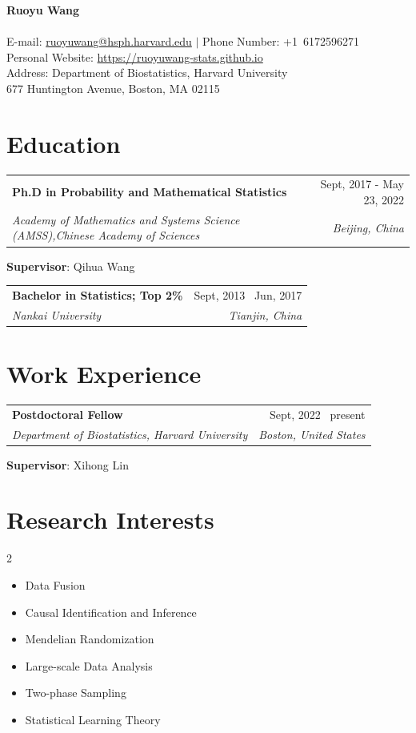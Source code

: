 \documentclass[letterpaper,12pt]{article}
\makeatletter
\newcommand{\resumeItemNoBullet}[2]{
  \item[]\small{
    \hspace{-9pt}\textbf{#1}{: #2 \vspace{-6pt}}
  }
}
\newcommand{\resumeSubheading}[4]{
  \vspace{-1pt}\item[]
  \begin{tabular*}{0.98\textwidth}{l@{\extracolsep{\fill}}r}
      \hspace{-10pt}\textbf{#1} & #2 \\
      \hspace{-10pt}\textit{\small#3} & \textit{\small #4} \\
    \end{tabular*}\vspace{-5pt}
}
\newcommand{\resumeSubHeadingListStart}{\begin{itemize}[leftmargin=*]}
\newcommand{\resumeSubHeadingListEnd}{\end{itemize}}
\newcommand{\shorterSection}[1]{\vspace{-10pt}\section{#1}}
\makeatother
\begin{document}
\begin{center}
  \small \textbf{%
  {\huge Ruoyu Wang}} \\
~\\
 \normalsize{
	E-mail: \href{mailto:ruoyuwang@hsph.harvard.edu}
	{\color{blue}ruoyuwang@hsph.harvard.edu} $\vert$ Phone Number:
	+1\ 6172596271}\\
   Personal Website: \href{https://ruoyuwang-stats.github.io}
   {\color{blue}https://ruoyuwang-stats.github.io}\\
  \normalsize{Address: Department of Biostatistics, Harvard University\\677 Huntington Avenue, Boston, MA 02115}
\end{center}

\shorterSection{Education}
  \resumeSubHeadingListStart
    \resumeSubheading
    {Ph.D in Probability and Mathematical Statistics}{Sept, 2017 - May 23, 2022}
      {Academy of Mathematics and Systems Science (AMSS),Chinese Academy of Sciences }{Beijing, China}
      {
       \resumeItemNoBullet{Supervisor}{Qihua Wang}
    }
    \resumeSubheading
    {Bachelor in Statistics;  Top 2\%}{Sept, 2013 \textendash \ Jun, 2017}
      {Nankai University}{Tianjin, China}      
  \resumeSubHeadingListEnd
  
\shorterSection{Work Experience}
  \resumeSubHeadingListStart
    \resumeSubheading
    {Postdoctoral Fellow}{Sept, 2022 \textendash \ present}
    {Department of Biostatistics, Harvard University}{Boston, United States}
    {
    	\resumeItemNoBullet{Supervisor}{Xihong Lin}
    }
  \resumeSubHeadingListEnd
  
\shorterSection{Research Interests}
\begin{multicols}{2}
	\resumeSubHeadingListStart
	\small
	\item{Data Fusion}
	\item{Causal Identification and Inference}
	\item{Mendelian Randomization}
	\item{Large-scale Data Analysis}
	\item{Two-phase Sampling}
	\item{Statistical Learning Theory}
	\resumeSubHeadingListEnd
\end{multicols}
 
\end{document}
